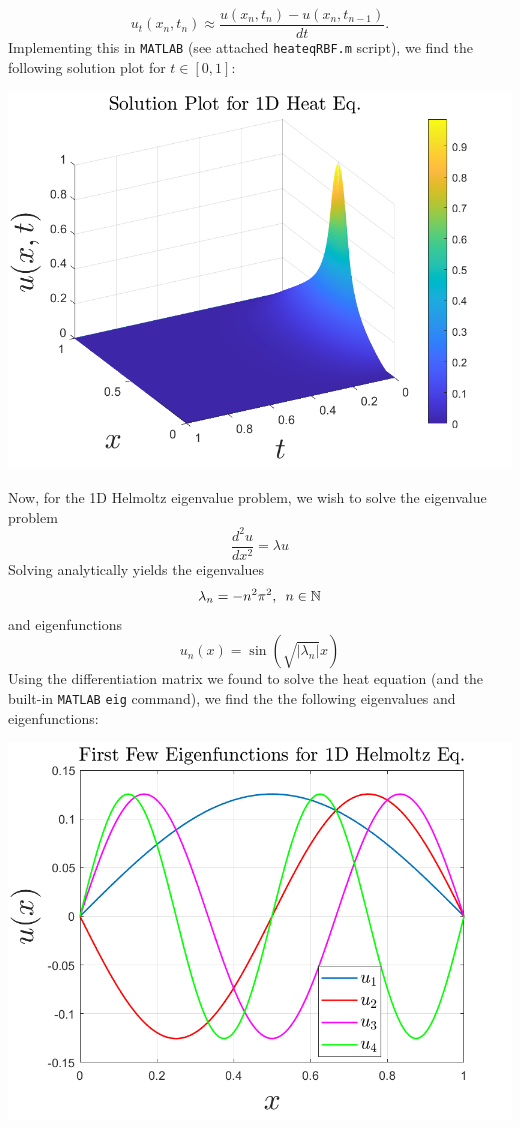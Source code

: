 \documentclass{article}
\begin{document}
\begin{itemize}
    \[u_t(x_n,t_n) \approx \frac{u(x_n,t_n) - u(x_n,t_{n-1})}{dt}.\]
    Implementing this in \verb+MATLAB+ (see attached \verb+heateqRBF.m+ script), we find the following solution plot for $t \in [0, 1]$:
    \begin{center}
        \includegraphics[scale = 0.5]{heatEqRBFSol}
    \end{center}
    Now, for the 1D Helmoltz eigenvalue problem, we wish to solve the eigenvalue problem
    \[\frac{d^2u}{dx^2} = \lambda u\]
    Solving analytically yields the eigenvalues
    \[\lambda_n = -n^2\pi^2, \hspace{0.5em} n \in \mathbb{N}\]
    and eigenfunctions
    \[u_n(x) = \sin(\sqrt{|\lambda_n|}x)\]
    Using the differentiation matrix we found to solve the heat equation (and the built-in \verb+MATLAB+ \verb+eig+ command), we find the the following eigenvalues and eigenfunctions:
    \begin{center}
        \includegraphics[scale = 0.5]{helmoltzEigFunc.png}

\end{center}
\end{itemize}
\end{document}
